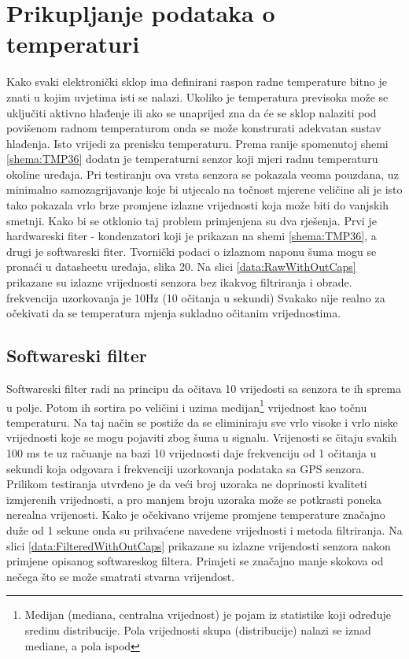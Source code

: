 \section{Prikupljanje podataka o temperaturi}
Kako svaki elektronički sklop ima definirani raspon radne temperature bitno je znati u kojim uvjetima isti se nalazi.
Ukoliko je temperatura previsoka može se uključiti aktivno hlađenje ili ako se unaprijed zna da će se sklop nalaziti pod povišenom radnom temperaturom onda se može konstrurati adekvatan sustav hlađenja.
Isto vrijedi za prenisku temperaturu.
Prema ranije spomenutoj shemi \ref{shema:TMP36} dodatn je temperaturni senzor koji mjeri radnu temperaturu okoline uređaja.
Pri testiranju ova vrsta senzora se pokazala veoma pouzdana, uz minimalno samozagrijavanje koje bi utjecalo na točnost mjerene veličine ali je isto tako pokazala vrlo brze promjene izlazne vrijednosti koja može biti do vanjskih smetnji.
Kako bi se otklonio taj problem primjenjena su dva rješenja.
Prvi je hardwareski fiter - kondenzatori koji je prikazan na shemi \ref{shema:TMP36}, a drugi je softwareski fiter.
Tvornički podaci o izlaznom naponu šuma mogu se pronaći u datasheetu uređaja, slika 20.
Na slici \ref{data:RawWithOutCaps} prikazane su izlazne vrijednosti senzora bez ikakvog filtriranja i obrade.
frekvencija uzorkovanja je 10Hz (10 očitanja u sekundi)
Svakako nije realno za očekivati da se temperatura mjenja sukladno očitanim vrijednostima.

\subsection{Softwareski filter}
Softwareski filter radi na principu da očitava 10 vrijedosti sa senzora te ih sprema u polje.
Potom ih sortira po veličini i uzima medijan\footnote{Medijan (mediana, centralna vrijednost) je pojam iz statistike koji određuje sredinu distribucije. Pola vrijednosti skupa (distribucije) nalazi se iznad mediane, a pola ispod} vrijednost kao točnu temperaturu.
Na taj način se postiže da se eliminiraju sve vrlo visoke i vrlo niske vrijednosti koje se mogu pojaviti zbog šuma u signalu.
Vrijenosti se čitaju svakih 100 ms te uz račuanje na bazi 10 vrijednosti daje frekvenciju od 1 očitanja u sekundi koja odgovara i frekvenciji uzorkovanja podataka sa GPS senzora.
Prilikom testiranja utvrđeno je da veći broj uzoraka ne doprinosti kvaliteti izmjerenih vrijednosti, a pro manjem broju uzoraka može se potkrasti poneka nerealna vrijenosti.
Kako je očekivano vrijeme promjene temperature značajno duže od 1 sekune onda su prihvaćene navedene vrijednosti i metoda filtriranja.
Na slici \ref{data:FilteredWithOutCaps} prikazane su izlazne vrijendosti senzora nakon primjene opisanog softwareskog filtera.
Primjeti se značajno manje skokova od nečega što se može smatrati stvarna vrijendost. 


